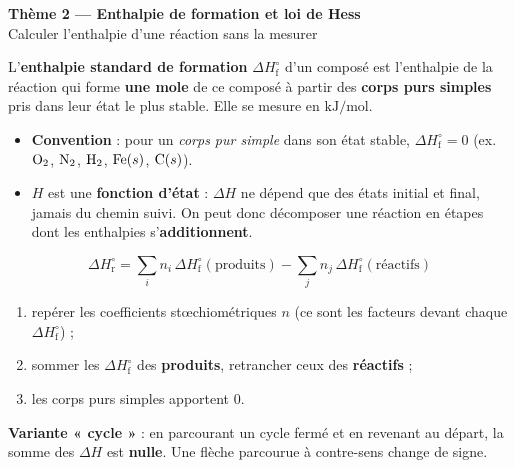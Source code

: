 \documentclass[11pt,a4paper]{article}
\begin{document}
\begin{center}
{\Large\bfseries\color{primarydark} Thème 2 — Enthalpie de formation et loi de Hess}\\[2pt]
{\color{primary}\small Calculer l'enthalpie d'une réaction sans la mesurer}
\end{center}

\begin{cle}
L'\textbf{enthalpie standard de formation} $\Delta H^\circ_{\text{f}}$ d'un composé est l'enthalpie de la réaction qui forme \textbf{une mole} de ce composé à partir des \textbf{corps purs simples} pris dans leur état le plus stable. Elle se mesure en $\si{\kilo\joule\per\mol}$.
\begin{itemize}[leftmargin=1.6em,topsep=2pt,itemsep=1.5pt]
  \item \textbf{Convention} : pour un \emph{corps pur simple} dans son état stable, $\Delta H^\circ_{\text{f}}=0$ \; (ex. $\ce{O2}$, $\ce{N2}$, $\ce{H2}$, $\ce{Fe}(s)$, $\ce{C}(s)$).
  \item $H$ est une \textbf{fonction d'état} : $\Delta H$ ne dépend que des états initial et final, jamais du chemin suivi. On peut donc décomposer une réaction en étapes dont les enthalpies s'\textbf{additionnent}.
\end{itemize}
\end{cle}

\begin{methode}
\[ \boxed{\;\Delta H^\circ_{\text{r}} = \sum_i n_i\,\Delta H^\circ_{\text{f}}(\text{produits}) - \sum_j n_j\,\Delta H^\circ_{\text{f}}(\text{réactifs})\;} \]
\begin{enumerate}[label=\arabic*.,leftmargin=1.8em,topsep=2pt,itemsep=1.5pt]
  \item repérer les coefficients stœchiométriques $n$ (ce sont les facteurs devant chaque $\Delta H^\circ_{\text{f}}$) ;
  \item sommer les $\Delta H^\circ_{\text{f}}$ des \textbf{produits}, retrancher ceux des \textbf{réactifs} ;
  \item les corps purs simples apportent $0$.
\end{enumerate}
\textbf{Variante « cycle »} : en parcourant un cycle fermé et en revenant au départ, la somme des $\Delta H$ est \textbf{nulle}. Une flèche parcourue à contre-sens change de signe.
\end{methode}
\end{document}
